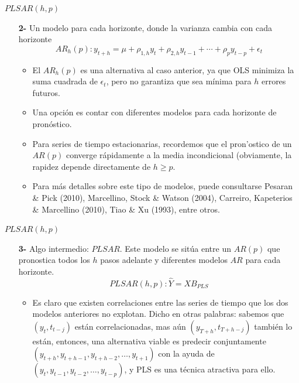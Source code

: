 \documentclass{beamer}
\newcommand{\?}{?`}
\begin{document}
\begin{frame}{$PLSAR(h,p)$}
  \begin{itemize}
  \item[\textbf{2-}] Un modelo para cada horizonte, donde la
    varianza cambia con cada horizonte 
    \begin{displaymath}
      AR_h(p): y_{t+h}=\mu+
      \rho_{1,h}y_{t}+\rho_{2,h}y_{t-1}+\cdots + \rho_py_{t-p}+\epsilon_t
    \end{displaymath}
    \begin{itemize}
    \item El $AR_h(p)$ es una alternativa al caso anterior, ya que OLS
      minimiza la suma cuadrada de $\epsilon_t$, pero no garantiza que
      sea m\'inima para $h$ errores futuros.
    \item Una opci\'on es contar con diferentes modelos para cada
      horizonte de pron\'ostico.
    \item Para series de tiempo estacionarias, recordemos que el
      pron'ostico de un $AR(p)$ converge r\'apidamente a la media
      incondicional (obviamente, la rapidez depende directamente de
      $h\geq p$.
    \item Para m\'as detalles sobre este tipo de modelos, puede
      consultarse Pesaran \& Pick (2010), Marcellino, Stock \& Watson
      (2004), Carreiro, Kapeterios \& Marcellino (2010), Tiao \& Xu
      (1993), entre otros.
    \end{itemize}
  \end{itemize}
\end{frame}

\begin{frame}{$PLSAR(h,p)$}
  \begin{itemize}
  \item[\textbf{3-}] Algo intermedio: $PLSAR$. Este modelo se
    sit\'ua entre un $AR(p)$ que pronostica todos los $h$ pasos
    adelante y diferentes modelos $AR$ para cada horizonte.
    \begin{displaymath}
      PLSAR(h,p): \hat{Y}=XB_{PLS}
    \end{displaymath}
    \begin{itemize}
    \item Es claro que existen correlaciones entre las series de
      tiempo que los dos modelos anteriores no explotan. Dicho en
      otras palabras: sabemos que $(y_t,t_{t-j})$ est\'an
      correlacionadas, mas a\'un $(y_{T+h},t_{T+h-j})$ tambi\'en lo
      est\'an, entonces, una alternativa viable es predecir
      conjuntamente $(y_{t+h},y_{t+h-1},y_{t+h-2},\ldots,y_{t+1})$
      con la ayuda de $(y_{t},y_{t-1},y_{t-2},\ldots,y_{t-p})$, y PLS
      es una t\'ecnica atractiva para ello.
    \end{itemize}
  \end{itemize}
\end{frame}
\end{document}
